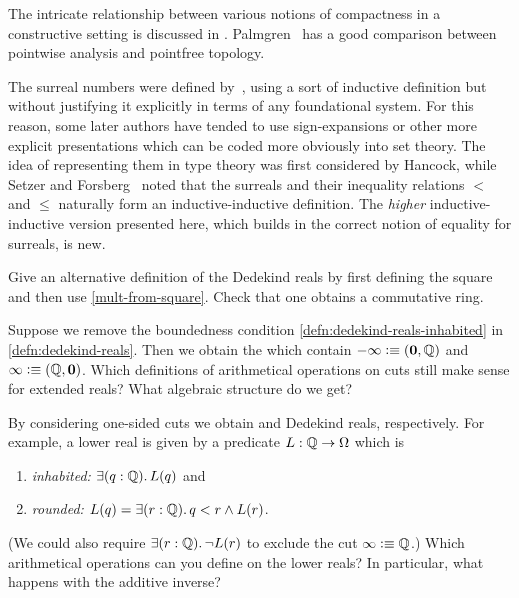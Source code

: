 The intricate relationship between various notions of compactness in a constructive
setting is discussed in \cite{bridges2002compactness}. Palmgren~\cite{Palmgren:FT} has a
good comparison between pointwise analysis and
pointfree topology.

The surreal numbers were defined by~\cite{conway:onag}, using a sort of inductive definition but without justifying it explicitly in terms of any foundational system.
For this reason, some later authors have tended to use sign-expansions or other more explicit presentations which can be coded more obviously into set theory.
The idea of representing them in type theory was first considered by Hancock, while
Setzer and Forsberg~\cite{forsbergfinite} noted that the surreals and their inequality relations $<$ and $\le$ naturally form an inductive-inductive definition.
The \emph{higher} inductive-inductive version presented here, which builds in the correct notion of equality for surreals, is new.


\sectionExercises

\begin{ex}\label{ex:alt-dedekind-reals}
 Give an alternative definition of the Dedekind reals by first defining the square and then use \cref{mult-from-square}.
 Check that one obtains a commutative ring.
\end{ex}

\begin{ex} \label{ex:RD-extended-reals}
  Suppose we remove the boundedness condition
  \ref{defn:dedekind-reals-inhabited} in \cref{defn:dedekind-reals}.
  Then we obtain the 
  which contain $-\infty \vcentcolon\equiv
  (\mathbf{0}, \mathbb{Q})$ and $\infty \vcentcolon\equiv (\mathbb{Q}, \mathbf{0})$. Which definitions of arithmetical
  operations on cuts still make sense for extended reals? What algebraic structure do we
  get?
\end{ex}

\begin{ex} \label{ex:RD-lower-cuts}
  By considering one-sided cuts we obtain  and  Dedekind reals,
  respectively. For example, a lower real is given by a predicate $L : \mathbb{Q} \to \Omega$
  which is
  \begin{enumerate}
  \item \emph{inhabited:} $\exis{q : \Q} L(q)$ and
  \item \emph{rounded:} $L(q) = \exis{r : \Q} q < r \land L(r)$.
  \end{enumerate}
  (We could also require $\exis{r : \Q} \lnot L(r)$ to exclude the cut $\infty \vcentcolon\equiv
  \mathbb{Q}$.) Which arithmetical operations can you define on the lower reals? In particular,
  what happens with the additive inverse?
\end{ex}

